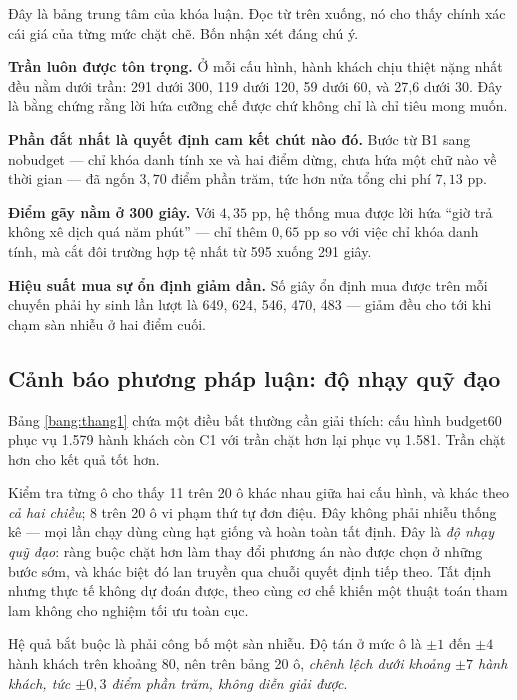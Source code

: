 Đây là bảng trung tâm của khóa luận. Đọc từ trên xuống, nó cho thấy chính xác cái giá của từng
mức chặt chẽ. Bốn nhận xét đáng chú ý.

\textbf{Trần luôn được tôn trọng.} Ở mỗi cấu hình, hành khách chịu thiệt nặng nhất đều nằm dưới
trần: 291 dưới 300, 119 dưới 120, 59 dưới 60, và 27{,}6 dưới 30. Đây là bằng chứng rằng lời hứa
cưỡng chế được chứ không chỉ là chỉ tiêu mong muốn.

\textbf{Phần đắt nhất là quyết định cam kết chút nào đó.} Bước từ B1 sang nobudget --- chỉ khóa
danh tính xe và hai điểm dừng, chưa hứa một chữ nào về thời gian --- đã ngốn $3{,}70$ điểm phần
trăm, tức hơn nửa tổng chi phí $7{,}13$ pp.

\textbf{Điểm gãy nằm ở 300 giây.} Với $4{,}35$ pp, hệ thống mua được lời hứa ``giờ trả không xê
dịch quá năm phút'' --- chỉ thêm $0{,}65$ pp so với việc chỉ khóa danh tính, mà cắt đôi trường
hợp tệ nhất từ 595 xuống 291 giây.

\textbf{Hiệu suất mua sự ổn định giảm dần.} Số giây ổn định mua được trên mỗi chuyến phải hy
sinh lần lượt là 649, 624, 546, 470, 483 --- giảm đều cho tới khi chạm sàn nhiễu ở hai điểm cuối.

\subsection{Cảnh báo phương pháp luận: độ nhạy quỹ đạo}

Bảng \ref{bang:thang1} chứa một điều bất thường cần giải thích: cấu hình budget60 phục vụ 1.579
hành khách còn C1 với trần chặt hơn lại phục vụ 1.581. Trần chặt hơn cho kết quả tốt hơn.

Kiểm tra từng ô cho thấy 11 trên 20 ô khác nhau giữa hai cấu hình, và khác theo \emph{cả hai
chiều}; 8 trên 20 ô vi phạm thứ tự đơn điệu. Đây không phải nhiễu thống kê --- mọi lần chạy dùng
cùng hạt giống và hoàn toàn tất định. Đây là \emph{độ nhạy quỹ đạo}: ràng buộc chặt hơn làm thay
đổi phương án nào được chọn ở những bước sớm, và khác biệt đó lan truyền qua chuỗi quyết định
tiếp theo. Tất định nhưng thực tế không dự đoán được, theo cùng cơ chế khiến một thuật toán tham
lam không cho nghiệm tối ưu toàn cục.

Hệ quả bắt buộc là phải công bố một sàn nhiễu. Độ tán ở mức ô là $\pm 1$ đến $\pm 4$ hành khách
trên khoảng 80, nên trên bảng 20 ô, \emph{chênh lệch dưới khoảng $\pm 7$ hành khách, tức
$\pm 0{,}3$ điểm phần trăm, không diễn giải được}.

